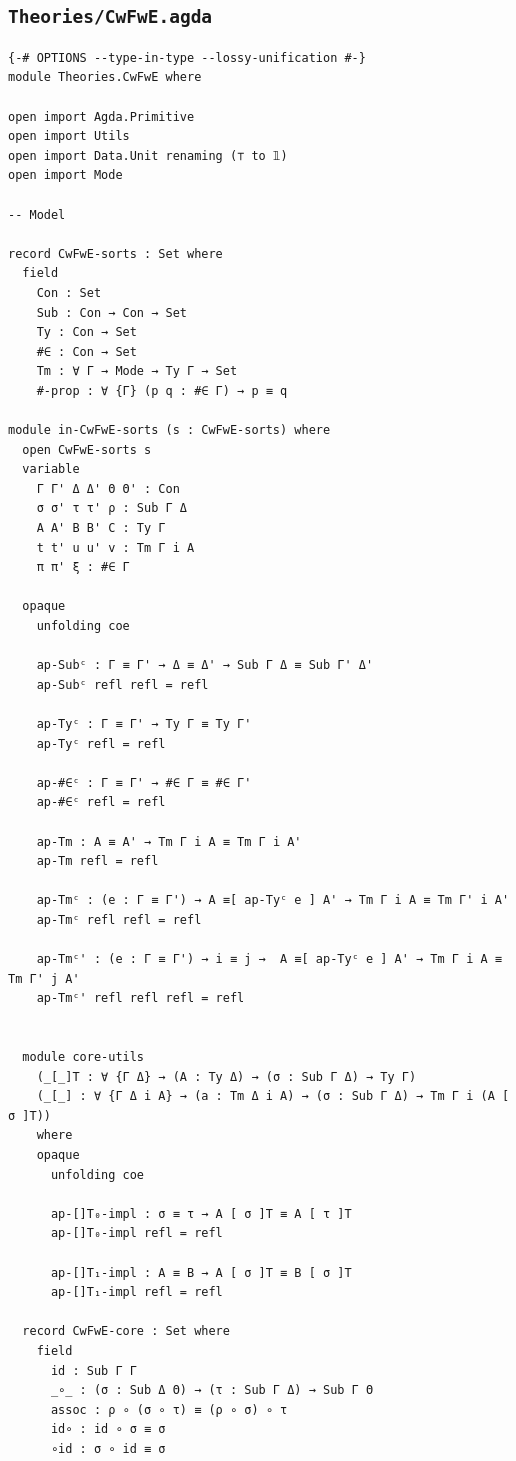 \documentclass[10pt,a4paper]{article}
\theoremstyle{definition}
\theoremstyle{remark}
\begin{document}
\subsection*{\texttt{Theories/CwFwE.agda}}
{\agdafont\begin{Verbatim}[breaklines=true,breakanywhere=true,fontsize=\scriptsize]
{-# OPTIONS --type-in-type --lossy-unification #-}
module Theories.CwFwE where

open import Agda.Primitive
open import Utils
open import Data.Unit renaming (⊤ to 𝟙)
open import Mode

-- Model

record CwFwE-sorts : Set where
  field
    Con : Set
    Sub : Con → Con → Set
    Ty : Con → Set
    #∈ : Con → Set
    Tm : ∀ Γ → Mode → Ty Γ → Set
    #-prop : ∀ {Γ} (p q : #∈ Γ) → p ≡ q

module in-CwFwE-sorts (s : CwFwE-sorts) where
  open CwFwE-sorts s
  variable
    Γ Γ' Δ Δ' Θ Θ' : Con
    σ σ' τ τ' ρ : Sub Γ Δ
    A A' B B' C : Ty Γ
    t t' u u' v : Tm Γ i A
    π π' ξ : #∈ Γ

  opaque
    unfolding coe

    ap-Subᶜ : Γ ≡ Γ' → Δ ≡ Δ' → Sub Γ Δ ≡ Sub Γ' Δ'
    ap-Subᶜ refl refl = refl

    ap-Tyᶜ : Γ ≡ Γ' → Ty Γ ≡ Ty Γ'
    ap-Tyᶜ refl = refl

    ap-#∈ᶜ : Γ ≡ Γ' → #∈ Γ ≡ #∈ Γ'
    ap-#∈ᶜ refl = refl

    ap-Tm : A ≡ A' → Tm Γ i A ≡ Tm Γ i A'
    ap-Tm refl = refl

    ap-Tmᶜ : (e : Γ ≡ Γ') → A ≡[ ap-Tyᶜ e ] A' → Tm Γ i A ≡ Tm Γ' i A'
    ap-Tmᶜ refl refl = refl

    ap-Tmᶜ' : (e : Γ ≡ Γ') → i ≡ j →  A ≡[ ap-Tyᶜ e ] A' → Tm Γ i A ≡ Tm Γ' j A'
    ap-Tmᶜ' refl refl refl = refl


  module core-utils
    (_[_]T : ∀ {Γ Δ} → (A : Ty Δ) → (σ : Sub Γ Δ) → Ty Γ)
    (_[_] : ∀ {Γ Δ i A} → (a : Tm Δ i A) → (σ : Sub Γ Δ) → Tm Γ i (A [ σ ]T))
    where
    opaque
      unfolding coe

      ap-[]T₀-impl : σ ≡ τ → A [ σ ]T ≡ A [ τ ]T
      ap-[]T₀-impl refl = refl
      
      ap-[]T₁-impl : A ≡ B → A [ σ ]T ≡ B [ σ ]T
      ap-[]T₁-impl refl = refl

  record CwFwE-core : Set where
    field
      id : Sub Γ Γ
      _∘_ : (σ : Sub Δ Θ) → (τ : Sub Γ Δ) → Sub Γ Θ
      assoc : ρ ∘ (σ ∘ τ) ≡ (ρ ∘ σ) ∘ τ
      id∘ : id ∘ σ ≡ σ
      ∘id : σ ∘ id ≡ σ


\end{Verbatim}}
\end{document}
